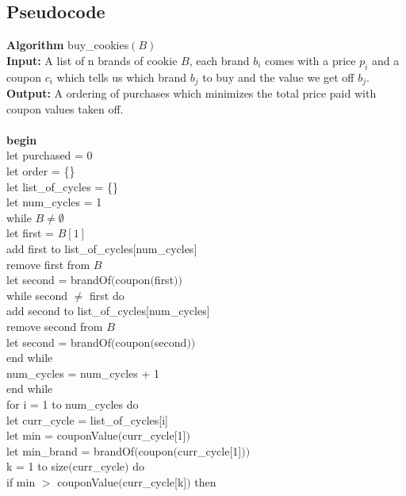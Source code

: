\documentclass{article}
\begin{document}
    \subsection{Pseudocode}
      \textbf{Algorithm} buy\_cookies$(B)$\\
      \textbf{Input:} A list of n brands of cookie $B$, each brand $b_{i}$ comes with a price $p_{i}$ and a coupon $c_{i}$ which tells us which brand $b_{j}$ to buy and the value we get off $b_{j}$.\\
      \textbf{Output:} A ordering of purchases which minimizes the total price paid with coupon values taken off.\\
      \\
      \textbf{begin}\\
      let purchased = 0\\
      let order = \{\}\\
      let list\_of\_cycles = \{\}\\
      let num\_cycles = 1\\
      while $B \neq \emptyset$\\
      \indent let first = $B[1]$\\
      \indent add first to list\_of\_cycles[num\_cycles]\\
      \indent remove first from $B$\\
      \indent let second = brandOf$($coupon$($first$))$\\
      \indent while second $\neq$ first do\\
      \indent \indent add second to list\_of\_cycles[num\_cycles]\\
      \indent \indent remove second from $B$\\
      \indent \indent let second = brandOf$($coupon$($second$))$\\
      \indent end while\\
      \indent num\_cycles = num\_cycles + 1\\
      end while\\
      for i = 1 to num\_cycles do\\
      \indent let curr\_cycle = list\_of\_cycles[i]\\
      \indent let min = couponValue$($curr\_cycle[1]$)$\\
      \indent let min\_brand = brandOf$($coupon$($curr\_cycle[1]$))$\\
      \indent k = 1 to size$($curr\_cycle$)$ do\\
      \indent \indent if min $>$ couponValue$($curr\_cycle[k]$)$ then\\
\end{document}
